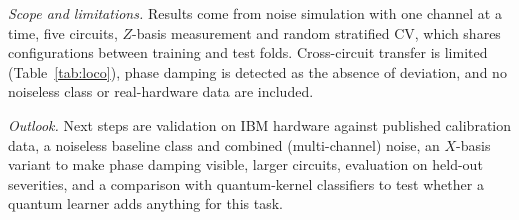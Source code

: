 \documentclass[conference]{IEEEtran}
\begin{document}
\emph{Scope and limitations.} Results come from noise simulation with one channel at a time, five circuits, $Z$-basis measurement and random stratified CV, which shares configurations between training and test folds. Cross-circuit transfer is limited (Table~\ref{tab:loco}), phase damping is detected as the absence of deviation, and no noiseless class or real-hardware data are included.

\emph{Outlook.} Next steps are validation on IBM hardware against published calibration data, a noiseless baseline class and combined (multi-channel) noise, an $X$-basis variant to make phase damping visible, larger circuits, evaluation on held-out severities, and a comparison with quantum-kernel classifiers to test whether a quantum learner adds anything for this task.

\end{document}
